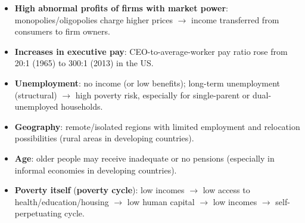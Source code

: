 \documentclass[a4paper,12pt]{article}
\begin{document}
\begin{itemize}
  \item \textbf{High abnormal profits of firms with market power}: monopolies/oligopolies charge higher prices $\to$ income transferred from consumers to firm owners.
  \item \textbf{Increases in executive pay}: CEO-to-average-worker pay ratio rose from 20:1 (1965) to 300:1 (2013) in the US.
  \item \textbf{Unemployment}: no income (or low benefits); long-term unemployment (structural) $\to$ high poverty risk, especially for single-parent or dual-unemployed households.
  \item \textbf{Geography}: remote/isolated regions with limited employment and relocation possibilities (rural areas in developing countries).
  \item \textbf{Age}: older people may receive inadequate or no pensions (especially in informal economies in developing countries).
  \item \textbf{Poverty itself} (\textbf{poverty cycle}): low incomes $\to$ low access to health/education/housing $\to$ low human capital $\to$ low incomes $\to$ self-perpetuating cycle.
\end{itemize}
\end{document}

